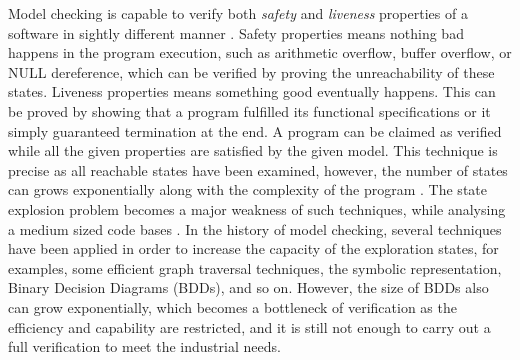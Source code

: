 Model checking is capable to verify both \textit{safety} and \textit{liveness} properties of a software in sightly different manner \cite{4544862}. Safety properties means nothing bad happens in the program execution, such as arithmetic overflow, buffer overflow, or NULL dereference, which can be verified by proving the unreachability of these states. Liveness properties means something good eventually happens. This can be proved by showing that a program fulfilled its functional specifications or it simply guaranteed termination at the end. A program can be claimed as verified while all the given properties are satisfied by the given model. This technique is precise as all reachable states have been examined, however, the number of states can grows exponentially along with the complexity of the program \cite{Clarke:2001:BMC:510986.510987, biere2003bounded}. The state explosion problem becomes a major weakness of such techniques, while analysing a medium sized code bases \cite{Yeolekar2013}. In the history of model checking, several techniques have been applied in order to increase the capacity of the exploration states, for examples, some efficient graph traversal techniques, the symbolic representation, Binary Decision Diagrams (BDDs), and so on. %
However, the size of BDDs also can grow exponentially, which becomes a bottleneck of verification as the efficiency and capability are restricted, and it is still not enough to carry out a full verification to meet the industrial needs.

